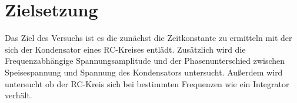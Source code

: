 \section{Zielsetzung}
\label{sec:Zielsetzung}

Das Ziel des Versuchs ist es die zunächst die Zeitkonstante zu ermitteln mit der sich der Kondensator eines RC-Kreises entlädt.
Zusätzlich wird die Frequenzabhängige Spannungsamplitude und der Phasenunterschied zwischen Speisespannung und Spannung des Kondensators untersucht.
Außerdem wird untersucht ob der RC-Kreis sich bei bestimmten Frequenzen wie ein Integrator verhält.